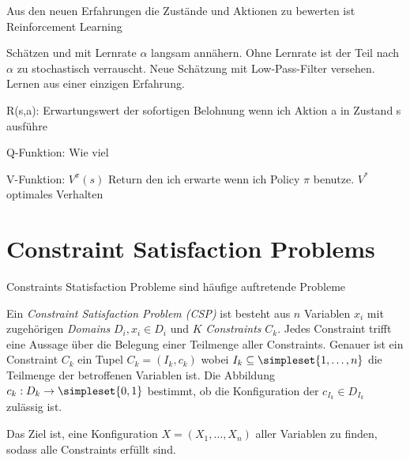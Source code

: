 \documentclass[ngerman]{../LaTeX-Templates/Paper/paper}
\begin{document}
Aus den neuen Erfahrungen die Zustände und Aktionen zu bewerten ist Reinforcement Learning

Schätzen und mit Lernrate $\alpha$ langsam annähern. Ohne Lernrate ist der Teil nach $\alpha$ zu stochastisch verrauscht. Neue Schätzung mit Low-Pass-Filter versehen. Lernen aus einer einzigen Erfahrung.

R(s,a): Erwartungswert der sofortigen Belohnung wenn ich Aktion a in Zustand s ausführe

Q-Funktion: Wie viel 

V-Funktion: $V^\pi(s)$ Return den ich erwarte wenn ich Policy $\pi$ benutze. $V^\ast$ optimales Verhalten










\section{Constraint Satisfaction Problems}
Constraints Statisfaction Probleme sind häufige auftretende Probleme


\begin{definition}
	Ein \emph{Constraint Satisfaction Problem (CSP)} ist besteht aus $n$ Variablen $x_i$ mit zugehörigen \emph{Domains} $D_i, x_i\in D_i$ und $K$ \emph{Constraints} $C_k$.
	Jedes Constraint trifft eine Aussage über die Belegung einer Teilmenge aller Constraints. Genauer ist ein Constraint $C_k$ ein Tupel $C_k=(I_k,c_k)$ wobei $I_k\subseteq\simpleset{1,\ldots,n}$ die Teilmenge der betroffenen Variablen ist. Die Abbildung $c_k:D_k\rightarrow \simpleset{0,1}$ bestimmt, ob die Konfiguration der $c_{I_k}\in D_{I_k}$ zulässig ist.

	Das Ziel ist, eine Konfiguration $X=(X_1,\ldots,X_n)$ aller Variablen zu finden, sodass alle Constraints erfüllt sind.
\end{definition}
\end{document}
